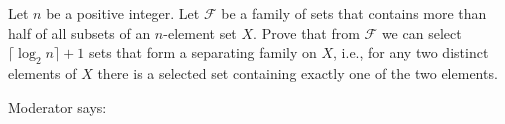 Let $n$ be a positive integer. Let $\mathcal{F}$ be a family of sets that contains more than half of all subsets of an $n$-element set $X$. Prove that from $\mathcal{F}$ we can select $\lceil \log_2 n \rceil + 1$ sets that form a separating family on $X$, i.e., for any two distinct elements of $X$ there is a selected set containing exactly one of the two elements.

Moderator says: 